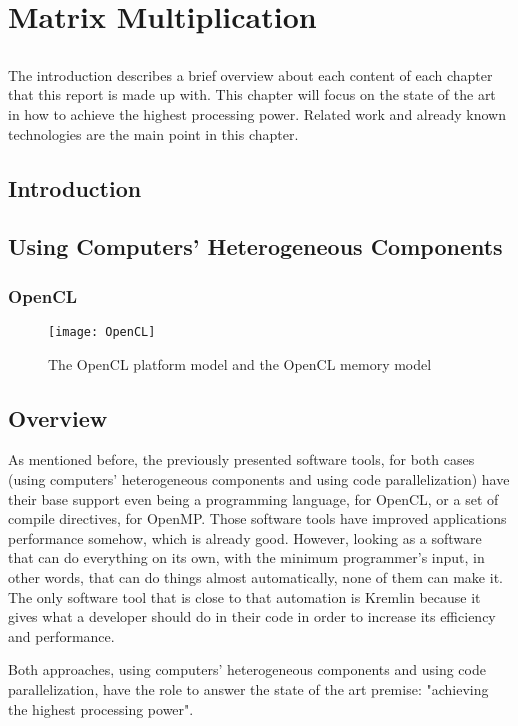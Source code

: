 \chapter{Matrix Multiplication} \label{chap:sota2}
\section*{}

The introduction describes a brief overview about each content of each chapter that this report is made up with. This chapter will focus on the state of the art in how to achieve the highest processing power. Related work and already known technologies are the main point in this chapter.  


\section{Introduction}


\section{Using Computers' Heterogeneous Components}\label{sec:dialecto}


\subsection{OpenCL}


\begin{figure}[t]
  \begin{center}
    \leavevmode
    \texttt{[image: OpenCL]}
    \caption{The OpenCL platform model and the OpenCL memory model}
    \label{fig:opcl}
  \end{center}
\end{figure}



\section{Overview}

As mentioned before, the previously presented software tools, for both cases (using computers' heterogeneous components and using code parallelization) have their base support even being a programming language, for OpenCL, or a set of compile directives, for OpenMP. Those software tools have improved applications performance somehow, which is already good. However, looking as a software that can do everything on its own, with the minimum programmer's input, in other words, that can do things almost automatically, none of them can make it. The only software tool that is close to that automation is Kremlin because it gives what a developer should do in their code in order to increase its efficiency and performance.

Both approaches, using computers' heterogeneous components and using code parallelization, have the role to answer the state of the art premise: "achieving the highest processing power".  
